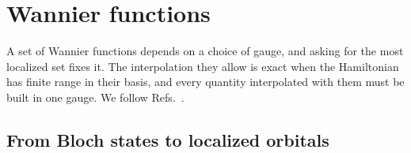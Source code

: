 \section{Wannier functions}\label{sec:3.6}

A set of Wannier functions depends on a choice of gauge, and asking for the most localized set fixes it. The interpolation they allow is exact when the Hamiltonian has finite range in their basis, and every quantity interpolated with them must be built in one gauge. We follow Refs.~\cite{marzari1997maximally,souza2001maximally,marzari2012maximally}.

\subsection{From Bloch states to localized orbitals}

